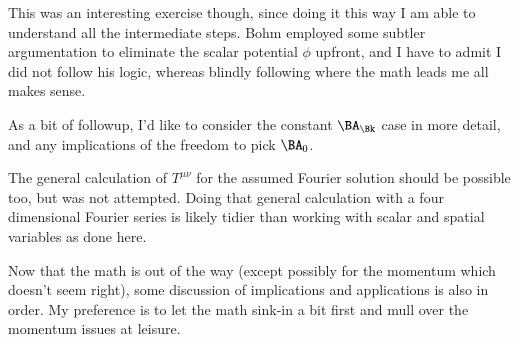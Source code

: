 This was an interesting exercise though, since doing it this way I am able to understand all the intermediate steps.  Bohm employed some subtler argumentation to eliminate the scalar potential $\phi$ upfront, and I have to admit I did not follow his logic, whereas blindly following where the math leads me all makes sense.

As a bit of followup, I'd like to consider the constant $\BA_\Bk$ case in more detail, and any implications of the freedom to pick $\BA_0$.

The general calculation of $T^{\mu\nu}$ for the assumed Fourier solution should be possible too, but was not attempted.  Doing that general calculation with a four dimensional Fourier series is likely tidier than working with scalar and spatial variables as done here.

Now that the math is out of the way (except possibly for the momentum which doesn't seem right), some discussion of implications and applications is also in order.  My preference is to let the math sink-in a bit first and mull over the momentum issues at leisure.



%

\EndArticle
